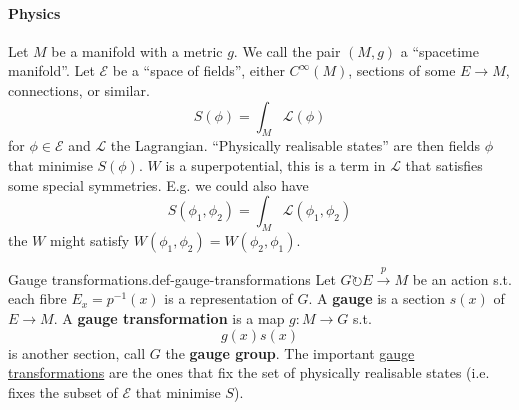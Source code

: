 \documentclass[10pt,]{book}
\newcommand{\terminology}[1]{\textbf{#1}}
\numberwithin{equation}{section}
\newcommand{\cinf}{C^\infty}
\newcommand{\inv}{^{-1}}
\newcommand{\acts}{\circlearrowright}
\begin{document}
\paragraph[{Physics}]{Physics}\hypertarget{paragraphs-20}{}
\hypertarget{p-770}{}%
Let  \(M\)  be a manifold with  a metric \(g\). We call the pair \((M,g)\) a ``spacetime manifold''. Let \(\mathcal E\) be  a ``space of fields'', either \(\cinf (M)\), sections of some \(E\to M\), connections, or similar.%
\begin{equation*}
S(\phi) = \int_M \mathcal    L (\phi)
\end{equation*}
for \(\phi\in \mathcal E\) and \(\mathcal L\) the Lagrangian. ``Physically realisable states'' are then fields \(\phi\) that minimise \(S(\phi)\). \(W\) is a superpotential, this is a term in \(\mathcal L\) that satisfies some special symmetries. E.g. we could also have%
\begin{equation*}
S(\phi_1, \phi_2) = \int_M \mathcal L(\phi_1,\phi_2)
\end{equation*}
the \(W\) might satisfy \(W(\phi_1, \phi_2) = W(\phi_2, \phi_1)\).%
\begin{definition}{Gauge transformations.}{def-gauge-transformations}%
\hypertarget{p-771}{}%
Let \(G \acts E \xrightarrow p M\) be an action s.t. each fibre \(E_x = p \inv(x)\) is a representation of \(G\). A \terminology{gauge} is a section \(s(x)\) of \(E \to M\). A \terminology{gauge transformation} is a map \(g\colon M \to G\) s.t.%
\begin{equation*}
g(x) s(x)
\end{equation*}
is another section, call \(G\) the \terminology{gauge group}. The important \hyperref[def-gauge-transformations]{gauge transformations} are the ones that fix the set of physically realisable states (i.e. fixes the subset of \(\mathcal E\) that minimise \(S\)).%
\end{definition}
%
%
\typeout{************************************************}
\typeout{************************************************}
%
\end{document}
